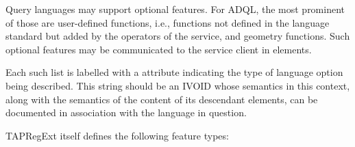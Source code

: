 \documentclass{ivoa}
\begin{document}


Query languages may support optional features.  For ADQL, the most prominent
of those are user-defined functions, i.e., functions not defined in the language
standard but added by the operators of the service, and geometry functions.
Such optional features may be communicated to the service client in
 elements.

Each such list is labelled with a  attribute
indicating the type of language option being described.
This string should be an IVOID whose semantics in this context,
along with the semantics of the content of its descendant
 elements,
can be documented in association with the language in question.

TAPRegExt itself defines the following feature types:
\end{document}
